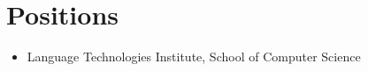 




\section{Positions}
\begin{itemize}[leftmargin=-0.4mm,partopsep=0pt,label=]
  \item {}
    Language Technologies Institute, School of Computer Science

\end{itemize}

